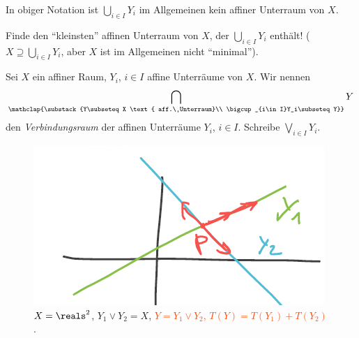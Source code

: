 \begin{bemerkung*}
    In obiger Notation ist \( \bigcup_{i\in I}Y_i \) im Allgemeinen kein affiner Unterraum von \( X \).
\end{bemerkung*}
\begin{frage*}
    Finde den \enquote{kleinsten} affinen Unterraum von \( X \), der \( \bigcup_{i\in I}Y_i \) enthält! (\zb \( X\supseteq \bigcup_{i\in I} Y_i\), aber \( X \) ist im Allgemeinen nicht \enquote{minimal}).
\end{frage*}
\begin{definition*}
    Sei \( X \) ein affiner Raum, \( Y_i \), \( i\in I \) affine Unterräume von \( X \). Wir nennen
    \begin{align*}
        \bigcap_{\mathclap{\substack{Y\subseteq X \text{ aff.\ Unterraum}\\
         \bigcup_{i\in I}Y_i\subseteq Y}}}Y
    \end{align*}
    den \emph{Verbindungsraum} der affinen Unterräume \( Y_i \), \( i\in I \). Schreibe \( \bigvee_{i\in I}Y_i \).
\end{definition*}
\begin{beispiel*}
    \begin{figure}[H]
        \centering
        \includegraphics[width=0.5\linewidth]{figures/verbindungsraum_zwei_geraden}
        \caption*{\( X=\reals^2 \), \( Y_1\vee Y_2=X \), \textcolor{OrangeRed}{\( Y=Y_1\vee Y_2 \), \( T(Y)=T(Y_1)+T(Y_2) \)}.}
        \label{fig:verbindungsraum_zwei_geraden}
    \end{figure}
    
\end{beispiel*}

